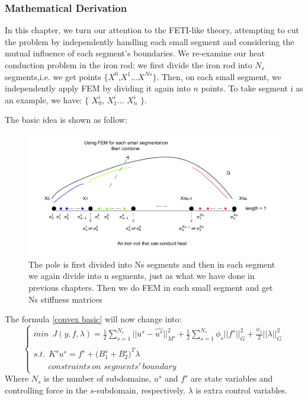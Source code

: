 \documentclass{article}
\begin{document}
    \subsubsection{Mathematical Derivation}
    In this chapter, we turn our attention to the FETI-like theory, attempting to cut the problem by independently handling each small segment and considering the mutual influence of each segment's boundaries. We re-examine our heat conduction problem in the iron rod: we first divide the iron rod into \(N_s\) segments,i.e. we get points $\{$$X^{0}$,$X^{1}$...$X^{Ns}$$\}$. Then, on each small segment, we independently apply FEM by dividing it again into \(n\) points. To take segment i as an example, we have: $\{$ $X^i_{0}$, $X^i_{1}$... $X^i_{n}$ $\}$. 
    
    The basic idea is shown as follow:
    \begin{figure}[H]
        \centering %
        \includegraphics[width=15cm]{pic/2.drawio.pdf} %
        \caption{The pole is first divided into Ns segments and then in each segment we again divide into n segments, just as what we have done in previous chapters. Then we do FEM in each small segment and get Ns stiffness matrices} %
        \label{2}
    \end{figure}
    The formula \ref{convex basic} will now change into:
    \begin{equation}
        \begin{cases}
            min\:\: J(y,f,\lambda)=\frac{1}{2}\sum_{s=1}^{N_s}||u^s-\hat{u^s}||^2_{M^s}+\frac{1}{2}\sum_{s=1}^{N_s}\phi_{s}||f^s||^2_G+\frac{\phi_{\lambda}}{2}||\lambda||^2_G\\
            \\
            s.t. \:\:  K^s u^s = f^s + ({B^s_1+B^s_2)}^T\lambda \\
            \:\:\:\:\:\:\:\: constraints\, on\, \,segments'\, boundary
            \label{ffinal}
        \end{cases}
    \end{equation}
    Where $N_s$ is the number of subdomains, $u^s$ and $f^s$ are state variables and controlling force in the $s$-subdomain, respectively. $\lambda$ is extra control variables.
    
\end{document}

